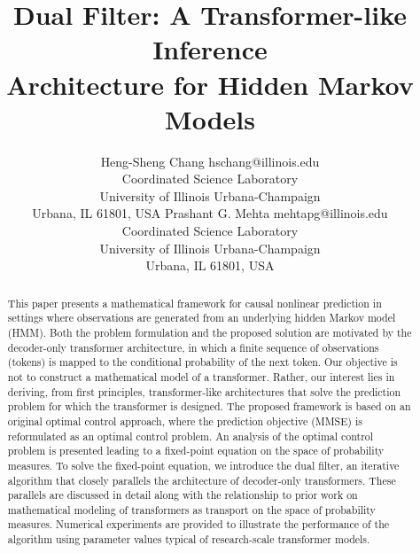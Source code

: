 \documentclass[twoside,11pt]{article}
\begin{document}
\title{Dual Filter: A Transformer-like Inference \\ Architecture for
  Hidden Markov Models}

\author{
  \name Heng-Sheng Chang \email hschang@illinois.edu \\
  \addr Coordinated Science Laboratory\\
  University of Illinois Urbana-Champaign\\
  Urbana, IL 61801, USA
  \AND
  \name Prashant G. Mehta \email mehtapg@illinois.edu \\
  \addr Coordinated Science Laboratory\\
  University of Illinois Urbana-Champaign\\
  Urbana, IL 61801, USA
}


\maketitle

\begin{abstract}%
This paper presents a mathematical framework for causal nonlinear prediction in settings where observations are generated from an underlying hidden Markov model (HMM).  
Both the problem formulation and the proposed solution are motivated by the decoder-only transformer architecture, in which a finite sequence of observations (tokens) is mapped to the conditional probability of the next token. 
Our objective is not to construct a mathematical model of a transformer. 
Rather, our interest lies in deriving, from first principles, transformer-like
architectures that solve the prediction problem for which the transformer is designed.  
The proposed framework is based on an original optimal control approach, where the prediction objective (MMSE) is reformulated as an optimal control problem.
An analysis of the optimal control problem is presented leading to a fixed-point equation on the space of probability measures. 
To solve the fixed-point equation, we introduce the dual filter, an iterative algorithm that closely parallels the architecture of decoder-only transformers.  
These parallels are discussed in detail along with the relationship to prior work on mathematical modeling of transformers as transport on the space of probability measures. 
Numerical experiments are provided to illustrate the performance of the algorithm using parameter values typical of research-scale transformer models. 
\end{abstract}
\end{document}
